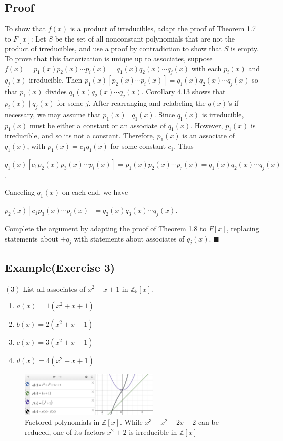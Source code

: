 \documentclass{article}
\begin{document}
\subsection*{Proof}
To show that $f(x)$ is a product of irreducibles, adapt the proof of Theorem 1.7
to $F[x]$: Let $S$ be the set of all nonconstant polynomials that are not the product
of irreducibles, and use a proof by contradiction to show that $S$ is empty.
To prove that this factorization is unique up to associates, suppose
$f(x) = p_1(x)p_2(x)\cdots p_i(x) = q_1(x)q_2(x)\cdots q_j(x)$ with each
$p_i(x)$ and $q_j(x)$ irreducible. Then $p_1(x)[p_2(x)\cdots p_i(x)] = q_1(x)q_2(x)\cdots q_j(x)$
so that $p_1(x)$ divides $q_1(x)q_2(x)\cdots q_j(x)$. Corollary 4.13 shows that
$p_i(x) \mid q_j(x)$ for some $j$. After rearranging and relabeling the $q(x)$'s
if necessary, we may assume that $p_1(x)\mid q_1(x)$. Since $q_1(x)$ is irreducible,
$p_1(x)$ must be either a constant or an associate of $q_1(x)$. However, 
$p_1(x)$ is irreducible, and so its not a constant. Therefore, $p_1(x)$ is an 
associate of $q_1(x)$, with $p_1(x) = c_1q_1(x)$ for some constant $c_1$. Thus
\begin{center}
    $q_1(x)[c_1p_2(x)p_3(x)\cdots p_i(x)] = p_1(x)p_2(x)\cdots p_r(x) = q_1(x)q_2(x)\cdots q_j(x)$.
\end{center}

Canceling $q_1(x)$ on each end, we have
\begin{center}
    $p_2(x)[c_1p_3(x)\cdots p_i(x)] = q_2(x)q_3(x)\cdots q_j(x)$.
\end{center}

Complete the argument by adapting the proof of Theorem 1.8 to $F[x]$,
replacing statements about $\pm q_j$ with statements about associates of $q_j(x)$. 
$\blacksquare$

\subsection*{Example(Exercise 3)}
$(3)$ List all associates of $x^2 + x + 1$ in $\mathbb{Z}_5[x]$.
\begin{enumerate}
    \item $a(x) = 1(x^2 + x + 1)$
    \item $b(x) = 2(x^2 + x + 1)$
    \item $c(x) = 3(x^2 + x + 1)$
    \item $d(x) = 4(x^2 + x + 1)$
\end{enumerate}




\begin{figure}
    \centering
    \includegraphics[width=0.6\textwidth]{factoredpolynomials.png}
    \caption{Factored polynomials in $\mathbb{Z}[x]$. While $x^3 + x^2 + 2x + 2$ can be reduced, one of its factors $x^2 + 2$ is irreducible in $\mathbb{Z}[x]$}
    \label{fig:division_algorithm}
\end{figure}
\end{document}
